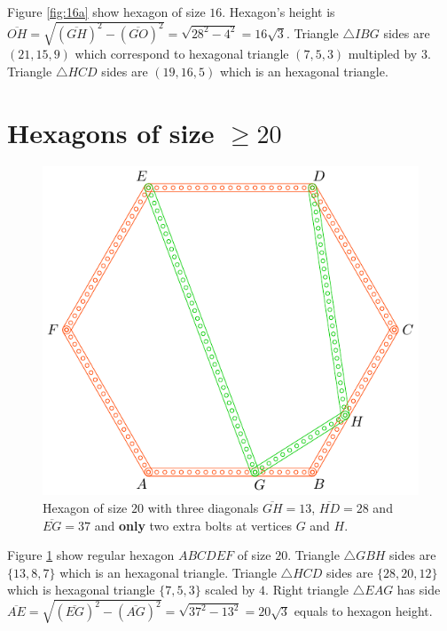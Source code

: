 \documentclass[11pt]{article}
\begin{document}
Figure \ref{fig:16a} show hexagon of size $16$. Hexagon's height is $\overline{OH}=\sqrt{(\overline{GH})^2-(\overline{GO})^2}=\sqrt{28^2-4^2}=16\sqrt3$. Triangle $\triangle{IBG}$ sides are $(21,15,9)$ which correspond to hexagonal triangle $(7,5,3)$ multipled by $3$. Triangle $\triangle{HCD}$ sides are $(19,16,5)$ which is an hexagonal triangle.


\section{Hexagons of size $\ge 20$}

\begin{figure}[H]
\centering
\includegraphics[scale=1]{20/hexa-20a}
\caption{Hexagon of size $20$ with three diagonals $\overline{GH} = 13$, $\overline{HD} = 28$ and $\overline{EG} = 37$ and \textbf{only} two extra bolts at vertices $G$ and $H$.}
\label{fig:20a}
\end{figure}

Figure \ref{fig:20a} show regular hexagon $ABCDEF$ of size $20$. Triangle $\triangle{GBH}$ sides are $\{13,8,7\}$ which is an hexagonal triangle. Triangle $\triangle{HCD}$ sides are $\{28,20,12\}$ which is hexagonal triangle $\{7,5,3\}$ scaled by $4$. Right triangle $\triangle{EAG}$ has side $\overline{AE} = \sqrt{(\overline{EG})^2 - (\overline{AG})^2} = \sqrt{37^2 - 13^2} = 20\sqrt3$ equals to hexagon height.
\end{document}

